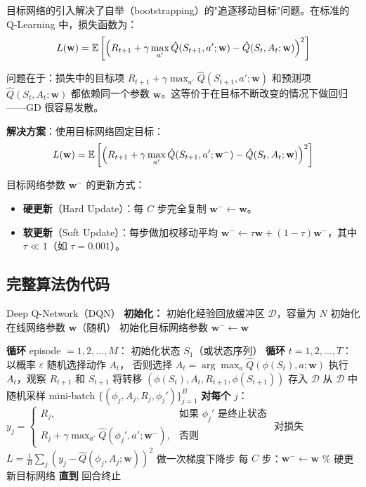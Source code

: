 目标网络的引入解决了自举（bootstrapping）的"追逐移动目标"问题。在标准的 Q-Learning 中，损失函数为：
$$L(\mathbf{w}) = \mathbb{E}\left[ \left( R_{t+1} + \gamma \max_{a'} \hat{Q}(S_{t+1}, a'; \mathbf{w}) - \hat{Q}(S_t, A_t; \mathbf{w}) \right)^2 \right]$$

问题在于：损失中的目标项 $R_{t+1} + \gamma \max_{a'} \hat{Q}(S_{t+1}, a'; \mathbf{w})$ 和预测项 $\hat{Q}(S_t, A_t; \mathbf{w})$ 都依赖同一个参数 $\mathbf{w}$。这等价于在目标不断改变的情况下做回归——GD 很容易发散。

\textbf{解决方案}：使用目标网络固定目标：
$$L(\mathbf{w}) = \mathbb{E}\left[ \left( R_{t+1} + \gamma \max_{a'} \hat{Q}(S_{t+1}, a'; \mathbf{w}^{-}) - \hat{Q}(S_t, A_t; \mathbf{w}) \right)^2 \right]$$

目标网络参数 $\mathbf{w}^{-}$ 的更新方式：
\begin{itemize}
    \item \textbf{硬更新}（Hard Update）：每 $C$ 步完全复制 $\mathbf{w}^{-} \leftarrow \mathbf{w}$。
    \item \textbf{软更新}（Soft Update）：每步做加权移动平均 $\mathbf{w}^{-} \leftarrow \tau \mathbf{w} + (1-\tau) \mathbf{w}^{-}$，其中 $\tau \ll 1$（如 $\tau = 0.001$）。
\end{itemize}

\subsection{完整算法伪代码}

\begin{myalgorithm}{Deep Q-Network（DQN）}
\textbf{初始化：}
\quad 初始化经验回放缓冲区 $\mathcal{D}$，容量为 $N$
\quad 初始化在线网络参数 $\mathbf{w}$（随机）
\quad 初始化目标网络参数 $\mathbf{w}^{-} \leftarrow \mathbf{w}$

\textbf{循环} episode $= 1, 2, \ldots, M$：
\quad 初始化状态 $S_1$（或状态序列）
\quad \textbf{循环} $t = 1, 2, \ldots, T$：
\quad \quad 以概率 $\varepsilon$ 随机选择动作 $A_t$，
\quad \quad 否则选择 $A_t = \arg\max_a \hat{Q}(\phi(S_t), a; \mathbf{w})$
\quad \quad 执行 $A_t$，观察 $R_{t+1}$ 和 $S_{t+1}$
\quad \quad 将转移 $(\phi(S_t), A_t, R_{t+1}, \phi(S_{t+1}))$ 存入 $\mathcal{D}$
\quad \quad 从 $\mathcal{D}$ 中随机采样 mini-batch $\{(\phi_j, A_j, R_j, \phi_j')\}_{j=1}^{B}$
\quad \quad \textbf{对每个} $j$：
\quad \quad \quad $y_j = \begin{cases}
R_j, & \text{如果 } \phi_j' \text{ 是终止状态}\\
R_j + \gamma \max_{a'} \hat{Q}(\phi_j', a'; \mathbf{w}^{-}), & \text{否则}
\end{cases}$
\quad \quad 对损失 $L = \frac{1}{B}\sum_j (y_j - \hat{Q}(\phi_j, A_j; \mathbf{w}))^2$ 做一次梯度下降步
\quad \quad 每 $C$ 步：$\mathbf{w}^{-} \leftarrow \mathbf{w}$ \quad \color{gray}\% 硬更新目标网络
\quad \textbf{直到} 回合终止
\end{myalgorithm}

